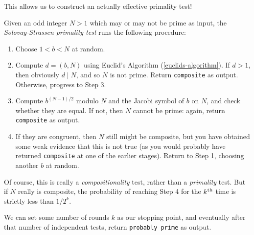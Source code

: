 \documentclass{article}
\begin{document}
This allows us to construct an actually effective primality test!

\begin{definition}
    Given an odd integer $N > 1$ which may or may not be prime as input, the \textit{Solovay-Strassen primality test} runs the following procedure:
    \begin{enumerate}
	    \item Choose $1 < b < N$ at random.
	    \item Compute $d = (b, N)$ using Euclid's Algorithm (\ref{euclids-algorithm}). If $d > 1$, then obviously $d \mid N$, and so $N$ is not prime. Return \texttt{composite} as output. Otherwise, progress to Step 3.
	    \item Compute $b^{(N-1)/2}$ modulo $N$ and the Jacobi symbol of $b$ on $N$, and check whether they are equal. If not, then $N$ cannot be prime: again, return \texttt{composite} as output.
	    \item If they are congruent, then $N$ still might be composite, but you have obtained some weak evidence that this is not true (as you would probably have returned \texttt{composite} at one of the earlier stages). Return to Step 1, choosing another $b$ at random.
	\end{enumerate}
	Of course, this is really a \textit{compositionality} test, rather than a \textit{primality} test. But if $N$ really is composite, the probability of reaching Step 4 for the $k^{\text{th}}$ time is strictly less than $1/2^k$.
	
	We can set some number of rounds $k$ as our stopping point, and eventually after that number of independent tests, return \texttt{probably prime} as output.
\end{definition}
\end{document}
